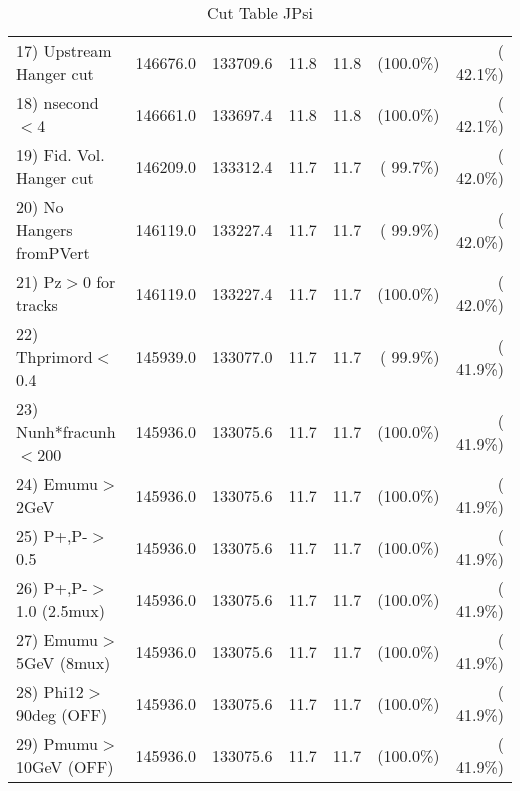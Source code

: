 \begin{table}[h!]
\begin{tabular}{||l||r|r|r|r|r|r||}
 17) Upstream Hanger cut  &     146676.0 &     133709.6 &         11.8 &         11.8 & (100.0\%) & ( 42.1\%) \\
 18) nsecond$<$4          &     146661.0 &     133697.4 &         11.8 &         11.8 & (100.0\%) & ( 42.1\%) \\
 19) Fid. Vol. Hanger cut &     146209.0 &     133312.4 &         11.7 &         11.7 & ( 99.7\%) & ( 42.0\%) \\
 20) No Hangers fromPVert &     146119.0 &     133227.4 &         11.7 &         11.7 & ( 99.9\%) & ( 42.0\%) \\
 21) Pz$>$0 for tracks    &     146119.0 &     133227.4 &         11.7 &         11.7 & (100.0\%) & ( 42.0\%) \\
 22) Thprimord$<$0.4      &     145939.0 &     133077.0 &         11.7 &         11.7 & ( 99.9\%) & ( 41.9\%) \\
 23) Nunh*fracunh$<$200   &     145936.0 &     133075.6 &         11.7 &         11.7 & (100.0\%) & ( 41.9\%) \\
 24) Emumu$>$2GeV         &     145936.0 &     133075.6 &         11.7 &         11.7 & (100.0\%) & ( 41.9\%) \\
 25) P+,P-$>$0.5          &     145936.0 &     133075.6 &         11.7 &         11.7 & (100.0\%) & ( 41.9\%) \\
 26) P+,P-$>$1.0 (2.5mux) &     145936.0 &     133075.6 &         11.7 &         11.7 & (100.0\%) & ( 41.9\%) \\
 27) Emumu$>$5GeV  (8mux) &     145936.0 &     133075.6 &         11.7 &         11.7 & (100.0\%) & ( 41.9\%) \\
 28) Phi12$>$90deg  (OFF) &     145936.0 &     133075.6 &         11.7 &         11.7 & (100.0\%) & ( 41.9\%) \\
 29) Pmumu$>$10GeV  (OFF) &     145936.0 &     133075.6 &         11.7 &         11.7 & (100.0\%) & ( 41.9\%) \\
 \hline
 \hline
 \end{tabular}
 \caption{Cut Table  JPsi     }
 \label{tab-cutcohjpsi-mumu_jpsi}
 \end{table}
